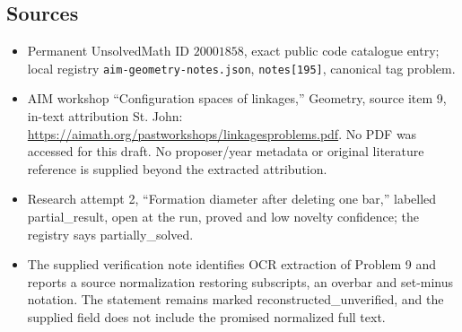 \documentclass[11pt]{article}
\begin{document}
\subsection{Sources}
\begin{itemize}
\item Permanent UnsolvedMath ID \(20001858\), exact public code catalogue entry; local registry \texttt{aim-geometry-notes.json}, \texttt{notes[195]}, canonical tag problem.
\item AIM workshop ``Configuration spaces of linkages,'' Geometry, source item 9, in-text attribution St. John: \url{https://aimath.org/pastworkshops/linkagesproblems.pdf}. No PDF was accessed for this draft. No proposer/year metadata or original literature reference is supplied beyond the extracted attribution.
\item Research attempt 2, ``Formation diameter after deleting one bar,'' labelled partial\_result, open at the run, proved and low novelty confidence; the registry says partially\_solved.
\item The supplied verification note identifies OCR extraction of Problem 9 and reports a source normalization restoring subscripts, an overbar and set-minus notation. The statement remains marked reconstructed\_unverified, and the supplied field does not include the promised normalized full text.
\end{itemize}
\end{document}
